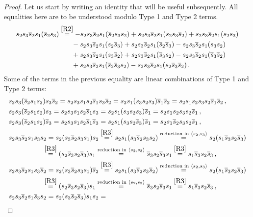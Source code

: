 \documentclass[12pt,reqno]{amsart}
\theoremstyle{definition}
\def\la{\langle}
\def\ra{\rangle}
\def\be{\begin{equation}}
\def\ee{\end{equation}}
\def\hs{\overline{s}}
\begin{document}
\begin{proof}
Let us start by writing an identity that will be useful subsequently. All
equalities here are to be understood modulo Type 1 and Type 2 terms. 
\be
\label{eq3}
\begin{aligned}
  s_2 s_3 \hs_2 s_1 (\hs_2 s_3)& \overset{\eqref{R2}}{=}
  - s_2 s_3 \hs_2 s_1 (\hs_2 s_3 s_2) + s_2 s_3 \hs_2 s_1 (s_2 s_3 \hs_2)
  + s_2 s_3 \hs_2 s_1 (s_2 s_3)\\
  &\phantom{spai} - s_2 s_3 \hs_2 s_1 (s_2 \hs_3) + s_2 s_3 \hs_2 s_1 (\hs_2 \hs_3)
  - s_2 s_3 \hs_2 s_1 (s_3 s_2) \\
  &\phantom{spai} + s_2 s_3 \hs_2 s_1 (s_3 \hs_2) + s_2 s_3 \hs_2 s_1 (\hs_3 s_2)
  - s_2 s_3 \hs_2 s_1 (\hs_3 \hs_2) \\
  &\phantom{spai} + s_2 s_3 \hs_2 s_1 (\hs_2 \hs_3 s_2)
  - s_2 s_3 \hs_2 s_1 (s_2 \hs_3 \hs_2) \,.
\end{aligned}
\ee
Some of the terms in the previous equality are linear combinations of Type 1 and
Type 2 terms:
\begin{align*}
  &s_2 s_3 (\hs_2 s_1 s_2) s_3 \hs_2    = s_2 s_3 s_1 s_2 \hs_1 s_3 \hs_2
  = s_2 s_1 (s_3 s_2 s_3) \hs_1 \hs_2 = s_2 s_1 s_2 s_3 s_2 \hs_1 \hs_2 \,,
\\
&s_2 s_3 (\hs_2 s_1 s_2) s_3    = s_2 s_3 s_1 s_2 \hs_1 s_3 = s_2 s_1 (s_3 s_2 s_3)
\hs_1 = s_2 s_1 s_2 s_3 s_2 \hs_1 \,,
\\
&s_2 s_3 (\hs_2 s_1 s_2) \hs_3    = s_2 s_3 s_1 s_2 \hs_1 \hs_3
= s_2 s_1 (s_3 s_2 \hs_3) \hs_1 = s_2 s_1 \hs_2 s_3 s_2 \hs_1 \,,
\\
&s_2 s_3 \hs_2 s_1 s_3 s_2    = s_2 (s_3 \hs_2 s_3 s_1) s_2
\overset{\eqref{R3}}{=} s_2 s_1 (s_3 \hs_2 s_3 s_2)
\overset{\text{reduction in }\la s_2,s_3\ra}{=} s_2 (s_1 \hs_3 s_2 \hs_3)  
\\
& \phantom{spacespaiii}    \overset{\eqref{R3}}{=} (s_2 \hs_3 s_2 \hs_3) s_1
\overset{\text{reduction in }\la s_2,s_3\ra}{=} \hs_3 s_2 \hs_3 s_1
\overset{\eqref{R3}}{=} s_1 \hs_3 s_2 \hs_3 \,,
\\
&s_2 s_3 \hs_2 s_1 s_3 \hs_2    = s_2 (s_3 \hs_2 s_3 s_1) \hs_2
\overset{\eqref{R3}}{=} s_2 s_1 (s_3 \hs_2 s_3 \hs_2)
\overset{\text{reduction in }\la s_2,s_3\ra}{=} s_2 (s_1 \hs_3 s_2 \hs_3)  
\\
&  \phantom{spacespaiii}  \overset{\eqref{R3}}{=} (s_2 \hs_3 s_2 \hs_3) s_1
\overset{\text{reduction in }\la s_2,s_3\ra}{=} \hs_3 s_2 \hs_3 s_1
\overset{\eqref{R3}}{=} s_1 \hs_3 s_2 \hs_3 \,,
\\
&s_2 s_3 \hs_2 s_1 \hs_3 s_2    = s_2 (s_3 \hs_2 \hs_3) s_1 s_2 =

\end{align*}
\end{proof}
\end{document}
